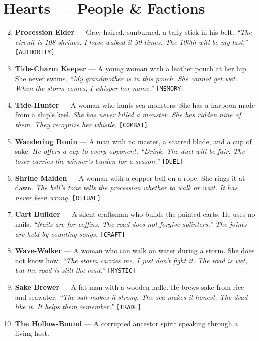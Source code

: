 \section*{Hearts --- People \& Factions}
\label{sec:lethai-al-people}
\begin{enumerate}
\setcounter{enumi}{1}
\item {} \textbf{Procession Elder} --- Gray-haired, sunburned, a tally stick in his belt.
  \hfill \textit{``The circuit is 108 shrines. I have walked it 99 times. The 100th will be my last.''} \texttt{[AUTHORITY]}
\item {} \textbf{Tide-Charm Keeper} --- A young woman with a leather pouch at her hip. She never swims.
  \hfill \textit{``My grandmother is in this pouch. She cannot get wet. When the storm comes, I whisper her name.''} \texttt{[MEMORY]}
\item {} \textbf{Tide-Hunter} --- A woman who hunts sea monsters. She has a harpoon made from a ship's keel.
  \hfill \textit{She has never killed a monster. She has ridden nine of them. They recognize her whistle.} \texttt{[COMBAT]}
\item {} \textbf{Wandering Ronin} --- A man with no master, a scarred blade, and a cup of sake.
  \hfill \textit{He offers a cup to every opponent. ``Drink. The duel will be fair. The loser carries the winner's burden for a season.''} \texttt{[DUEL]}
\item {} \textbf{Shrine Maiden} --- A woman with a copper bell on a rope. She rings it at dawn.
  \hfill \textit{The bell's tone tells the procession whether to walk or wait. It has never been wrong.} \texttt{[RITUAL]}
\item {} \textbf{Cart Builder} --- A silent craftsman who builds the painted carts. He uses no nails.
  \hfill \textit{``Nails are for coffins. The road does not forgive splinters.'' The joints are held by counting songs.} \texttt{[CRAFT]}
\item {} \textbf{Wave-Walker} --- A woman who can walk on water during a storm. She does not know how.
  \hfill \textit{``The storm carries me. I just don't fight it. The road is wet, but the road is still the road.''} \texttt{[MYSTIC]}
\item {} \textbf{Sake Brewer} --- A fat man with a wooden ladle. He brews sake from rice and seawater.
  \hfill \textit{``The salt makes it strong. The sea makes it honest. The dead like it. It helps them remember.''} \texttt{[TRADE]}
\item {} \textbf{The Hollow-Bound} --- A corrupted ancestor spirit speaking through a living host.

\end{enumerate}
